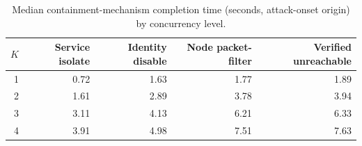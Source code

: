 \begin{table}[t]
\centering
\caption{Median containment-mechanism completion time (seconds, attack-onset origin) by concurrency level.}
\label{tab:scal-mechanism}
\begin{tabular}{rrrrr}
\toprule
$K$ & Service isolate & Identity disable & Node packet-filter & Verified unreachable \\
\midrule
1 & 0.72 & 1.63 & 1.77 & 1.89 \\
2 & 1.61 & 2.89 & 3.78 & 3.94 \\
3 & 3.11 & 4.13 & 6.21 & 6.33 \\
4 & 3.91 & 4.98 & 7.51 & 7.63 \\
\bottomrule
\end{tabular}
\end{table}
